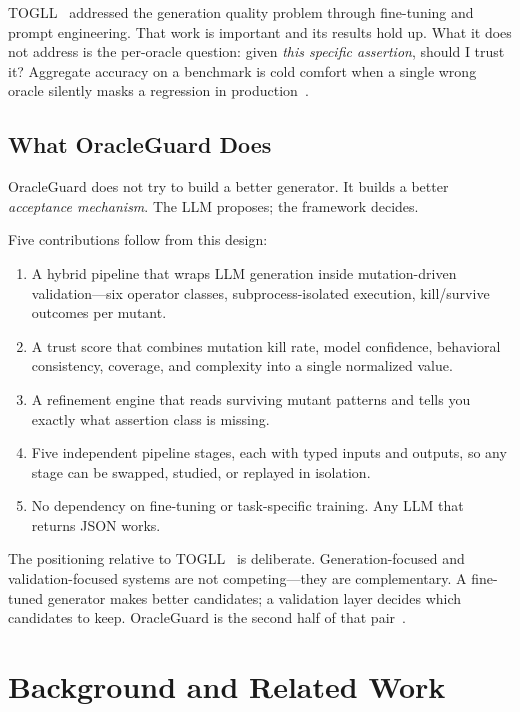 \documentclass[conference]{IEEEtran}
\begin{document}
TOGLL~\cite{hossain2024togll} addressed the generation quality problem through fine-tuning and prompt engineering. That work is important and its results hold up. What it does not address is the per-oracle question: given \emph{this specific assertion}, should I trust it? Aggregate accuracy on a benchmark is cold comfort when a single wrong oracle silently masks a regression in production~\cite{bodicoat2025understanding,xiong2023express_confidence}.

\subsection{What OracleGuard Does}

OracleGuard does not try to build a better generator. It builds a better \emph{acceptance mechanism}. The LLM proposes; the framework decides.

Five contributions follow from this design:

\begin{enumerate}
\item A hybrid pipeline that wraps LLM generation inside mutation-driven validation—six operator classes, subprocess-isolated execution, kill/survive outcomes per mutant.
\item A trust score that combines mutation kill rate, model confidence, behavioral consistency, coverage, and complexity into a single normalized value.
\item A refinement engine that reads surviving mutant patterns and tells you exactly what assertion class is missing.
\item Five independent pipeline stages, each with typed inputs and outputs, so any stage can be swapped, studied, or replayed in isolation.
\item No dependency on fine-tuning or task-specific training. Any LLM that returns JSON works.
\end{enumerate}

The positioning relative to TOGLL~\cite{hossain2024togll} is deliberate. Generation-focused and validation-focused systems are not competing—they are complementary. A fine-tuned generator makes better candidates; a validation layer decides which candidates to keep. OracleGuard is the second half of that pair~\cite{liu2024uncertainty_estimation}.

\section{Background and Related Work}
\end{document}
